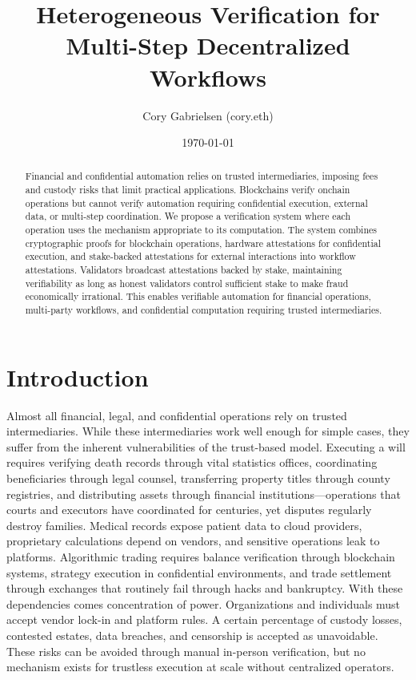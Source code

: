 \documentclass[10pt]{article}
\title{Heterogeneous Verification for Multi-Step Decentralized Workflows}
\author{Cory Gabrielsen (cory.eth)}
\date{\today}
\begin{document}
\maketitle

\begin{abstract}
Financial and confidential automation relies on trusted intermediaries, imposing fees and custody risks that limit practical applications. Blockchains verify onchain operations but cannot verify automation requiring confidential execution, external data, or multi-step coordination. We propose a verification system where each operation uses the mechanism appropriate to its computation. The system combines cryptographic proofs for blockchain operations, hardware attestations for confidential execution, and stake-backed attestations for external interactions into workflow attestations. Validators broadcast attestations backed by stake, maintaining verifiability as long as honest validators control sufficient stake to make fraud economically irrational. This enables verifiable automation for financial operations, multi-party workflows, and confidential computation requiring trusted intermediaries.
\end{abstract}

\section{Introduction}

Almost all financial, legal, and confidential operations rely on trusted intermediaries. While these intermediaries work well enough for simple cases, they suffer from the inherent vulnerabilities of the trust-based model. Executing a will requires verifying death records through vital statistics offices, coordinating beneficiaries through legal counsel, transferring property titles through county registries, and distributing assets through financial institutions—operations that courts and executors have coordinated for centuries, yet disputes regularly destroy families. Medical records expose patient data to cloud providers, proprietary calculations depend on vendors, and sensitive operations leak to platforms. Algorithmic trading requires balance verification through blockchain systems, strategy execution in confidential environments, and trade settlement through exchanges that routinely fail through hacks and bankruptcy. With these dependencies comes concentration of power. Organizations and individuals must accept vendor lock-in and platform rules. A certain percentage of custody losses, contested estates, data breaches, and censorship is accepted as unavoidable. These risks can be avoided through manual in-person verification, but no mechanism exists for trustless execution at scale without centralized operators.
\end{document}

